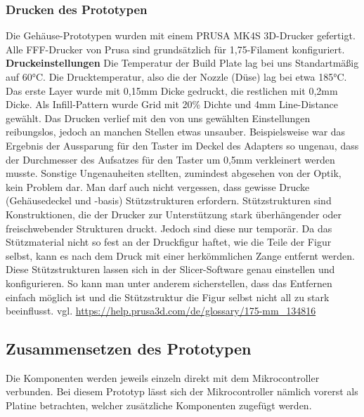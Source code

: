 \documentclass[11pt, twoside]{article}
\begin{document}
\subsubsection{Drucken des Prototypen}
Die Gehäuse-Prototypen wurden mit einem \glqq PRUSA MK4S\grqq{} 3D-Drucker gefertigt. Alle FFF-Drucker von Prusa sind grundsätzlich für 1,75-Filament konfiguriert.
\vspace{4mm}\newline
\textbf{Druckeinstellungen} \newline
Die Temperatur der Build Plate lag bei uns Standartmäßig auf 60°C. Die Drucktemperatur, also die der Nozzle (Düse) lag bei etwa 185°C. \newline
Das erste Layer wurde mit 0,15mm Dicke gedruckt, die restlichen mit 0,2mm Dicke. \newline
Als Infill-Pattern wurde \glqq Grid\grqq{} mit 20\% Dichte und 4mm Line-Distance gewählt. \newline
Das Drucken verlief mit den von uns gewählten Einstellungen reibungslos, jedoch an manchen Stellen etwas unsauber. Beispielsweise war das Ergebnis der Aussparung für den Taster im Deckel des Adapters so ungenau, dass der Durchmesser des Aufsatzes für den Taster um 0,5mm verkleinert werden musste. Sonstige Ungenauheiten stellten, zumindest abgesehen von der Optik, kein Problem dar. \newline
Man darf auch nicht vergessen, dass gewisse Drucke (Gehäusedeckel und -basis) Stützstrukturen erfordern. Stützstrukturen sind Konstruktionen, die der Drucker zur Unterstützung stark überhängender oder freischwebender Strukturen druckt. Jedoch sind diese nur temporär. Da das Stützmaterial nicht so fest an der Druckfigur haftet, wie die Teile der Figur selbst, kann es nach dem Druck mit einer herkömmlichen Zange entfernt werden. Diese Stützstrukturen lassen sich in der Slicer-Software genau einstellen und konfigurieren. So kann man unter anderem sicherstellen, dass das Entfernen einfach möglich ist und die Stützstruktur die Figur selbst nicht all zu stark beeinflusst.
\vspace{4mm}\newline
vgl. \url{https://help.prusa3d.com/de/glossary/175-mm_134816}
\subsection{Zusammensetzen des Prototypen}
Die Komponenten werden jeweils einzeln direkt mit dem Mikrocontroller verbunden. Bei diesem Prototyp lässt sich der Mikrocontroller nämlich vorerst als Platine betrachten, welcher zusätzliche Komponenten zugefügt werden.
\end{document}
